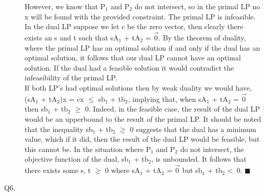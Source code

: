 \documentclass[10pt]{csc_assignment}
\begin{document}
\begin{description}
However, we know that P$_{1}$ and P$_{2}$ do not intersect, so in the primal LP no
x will be found with the provided constraint. The primal LP is infeasible. In the dual LP suppose we let c be the zero vector, then clearly there exists an s and t such that sA$_{1}$ + tA$_{2}$ = $\vec{0}$. By the theorem of duality, where the primal LP has an optimal solution if and only if the dual has an optimal solution, it follows that our dual LP cannot have an optimal solution. If the dual had a feasible solution it would contradict the infeasibility of the primal LP.\\

If both LP's had optimal solutions then by weak duality we would have,  
(sA$_{1}$ + tA$_{2}$)x = cx $\leqslant$ sb$_{1}$ + tb$_{2}$, implying that, when sA$_{1}$ + tA$_{2}$ = $\vec{0}$ then sb$_{1}$ + tb$_{2}$ $\geqslant$ 0. Indeed, in the feasible case, the result of the dual LP would be an upperbound to the result of the primal LP. It should be noted that the inequality sb$_{1}$ + tb$_{2}$ $\geqslant$ 0 suggests that the dual has a minimum value, which if it did, then the result of the dual LP would be feasible, but this cannot be. In the situation where P$_{1}$ and P$_{2}$ do not intersect, the objective function of the dual, sb$_{1}$ + tb$_{2}$, is unbounded. It follows that there exists some s, t $\geqslant$ 0  where sA$_{1}$ + tA$_{2}$ = $\vec{0}$ but sb$_{1}$ + tb$_{2}$ \textless ~0. $\blacksquare$


\newpage
\item[Q6.]






\end{description}
\end{document}

